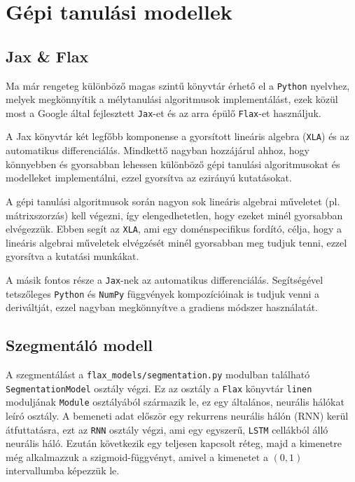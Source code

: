 \section{Gépi tanulási modellek}

\subsection{Jax \& Flax}
Ma már rengeteg különböző magas szintű könyvtár érhető el a \texttt{Python} nyelvhez, melyek 
megkönnyítik a mélytanulási algoritmusok implementálást, ezek közül most a Google által fejlesztett \texttt
{Jax}-et\cite{jax2018github} és az arra épülő \texttt{Flax}-et\cite{flax2020github} használjuk.

A Jax könyvtár két legfőbb komponense a gyorsított lineáris algebra (\texttt{XLA}) és az automatikus 
differenciálás. Mindkettő nagyban hozzájárul ahhoz, hogy könnyebben és gyorsabban lehessen különböző 
gépi tanulási algoritmusokat és modelleket implementálni, ezzel gyorsítva az ezirányú kutatásokat.

A gépi tanulási algoritmusok során nagyon sok lineáris algebrai műveletet (pl. mátrixszorzás) kell 
végezni, így elengedhetetlen, hogy ezeket minél gyorsabban elvégezzük. Ebben segít az \texttt{XLA}, ami 
egy doménspecifikus fordító, célja, hogy a lineáris algebrai műveletek elvégzését minél gyorsabban
meg tudjuk tenni, ezzel gyorsítva a kutatási munkákat.

A másik fontos része a \texttt{Jax}-nek az automatikus differenciálás. Segítségével tetszőleges
\texttt{Python} és \texttt{NumPy}\cite{harris2020array} függvények kompozícióinak is tudjuk venni a deriváltját,
ezzel nagyban megkönnyítve a gradiens módszer használatát.

\subsection{Szegmentáló modell}
A szegmentálást a \texttt{flax\_models/segmentation.py} modulban található \texttt{SegmentationModel}
osztály végzi. Ez az osztály a \texttt{Flax} könyvtár \texttt{linen} moduljának \texttt{Module} osztályából
származik le, ez egy általános, neurális hálókat leíró osztály. A bemeneti adat először egy rekurrens neurális
hálón (RNN) kerül átfuttatásra, ezt az \texttt{RNN} osztály végzi, ami egy egyszerű, \texttt{LSTM} cellákból álló
neurális háló. Ezután következik egy teljesen kapcsolt réteg, majd a kimenetre még alkalmazzuk a szigmoid-függvényt,
amivel a kimenetet a $(0,1)$ intervallumba képezzük le.

